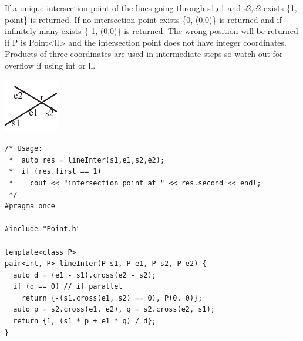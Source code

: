\begin{minipage}{75mm}
If a unique intersection point of the lines going through s1,e1 and s2,e2 exists \{1, point\} is returned.
If no intersection point exists \{0, (0,0)\} is returned and if infinitely many exists \{-1, (0,0)\} is returned.
The wrong position will be returned if P is Point<ll> and the intersection point does not have integer coordinates.
Products of three coordinates are used in intermediate steps so watch out for overflow if using int or ll.
\end{minipage}
\begin{minipage}{15mm}
\includegraphics[width=\textwidth]{"../code/Geometry/2D Primitive/lineIntersection"}
\end{minipage}
\begin{verbatim}
/* Usage:
 *  auto res = lineInter(s1,e1,s2,e2);
 *  if (res.first == 1)
 *    cout << "intersection point at " << res.second << endl;
 */
#pragma once

#include "Point.h"

template<class P>
pair<int, P> lineInter(P s1, P e1, P s2, P e2) {
  auto d = (e1 - s1).cross(e2 - s2);
  if (d == 0) // if parallel
    return {-(s1.cross(e1, s2) == 0), P(0, 0)};
  auto p = s2.cross(e1, e2), q = s2.cross(e2, s1);
  return {1, (s1 * p + e1 * q) / d};
}
\end{verbatim}
